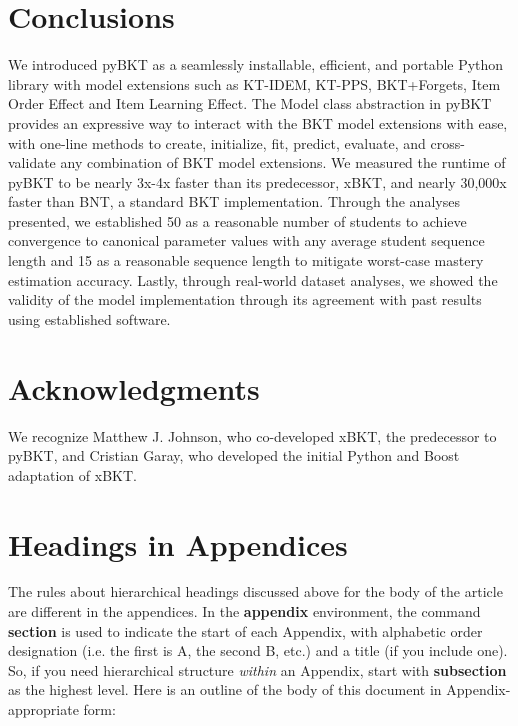 \documentclass{edm_article}
\begin{document}
\section{Conclusions}
We introduced pyBKT as a seamlessly installable, efficient, and portable Python library with model extensions such as KT-IDEM, KT-PPS, BKT+Forgets, Item Order Effect and Item Learning Effect. The Model class abstraction in pyBKT provides an expressive way to interact with the BKT model extensions with ease, with one-line methods to create, initialize, fit, predict, evaluate, and cross-validate any combination of BKT model extensions. We measured the runtime of pyBKT to be nearly 3x-4x faster than its predecessor, xBKT, and nearly 30,000x faster than BNT, a standard BKT implementation. Through the analyses presented, we established 50 as a reasonable number of students to achieve convergence to canonical parameter values with any average student sequence length and 15 as a reasonable sequence length to mitigate worst-case mastery estimation accuracy. Lastly, through real-world dataset analyses, we showed the validity of the model implementation through its agreement with past results using established software. 



\section*{Acknowledgments}
We recognize Matthew J. Johnson, who co-developed xBKT, the predecessor to pyBKT, and Cristian Garay, who developed the initial Python and Boost adaptation of xBKT.

%
{\footnotesize}  %
% 
%
%
\iffalse
\appendix
\section{Headings in Appendices}
The rules about hierarchical headings discussed above for
the body of the article are different in the appendices.
In the \textbf{appendix} environment, the command
\textbf{section} is used to
indicate the start of each Appendix, with alphabetic order
designation (i.e. the first is A, the second B, etc.) and
a title (if you include one).  So, if you need
hierarchical structure
\textit{within} an Appendix, start with \textbf{subsection} as the
highest level. Here is an outline of the body of this
document in Appendix-appropriate form:
\end{document}
